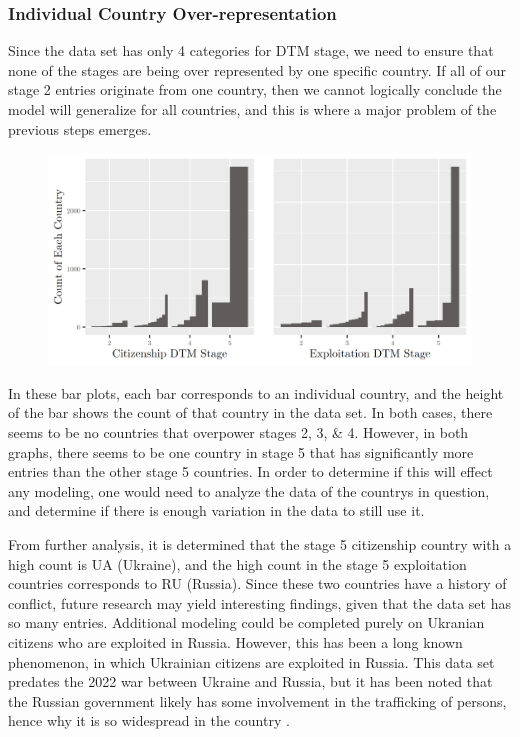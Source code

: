 \documentclass{article} %
\begin{document}
\subsubsection{Individual Country Over-representation}\label{Overrep}

Since the data set has only 4 categories for DTM stage, we need to ensure that none of the stages are being over represented by one specific country. If all of our stage 2 entries originate from one country, then we cannot logically conclude the model will generalize for all countries, and this is where a major problem of the previous steps emerges.

\FloatBarrier
\begin{figure}[H]
	\includegraphics[width = \textwidth]{CountryCountBarplot}
\end{figure}
\FloatBarrier

In these bar plots, each bar corresponds to an individual country, and the height of the bar shows the count of that country in the data set. In both cases, there seems to be no countries that overpower stages 2, 3, \& 4. However, in both graphs, there seems to be one country in stage 5 that has significantly more entries than the other stage 5 countries. In order to determine if this will effect any modeling, one would need to analyze the data of the countrys in question, and determine if there is enough variation in the data to still use it. 

From further analysis, it is determined that the stage 5 citizenship country with a high count is UA (Ukraine), and the high count in the stage 5 exploitation countries corresponds to RU (Russia). Since these two countries have a history of conflict, future research may yield interesting findings, given that the data set has so many entries. Additional modeling could be completed purely on Ukranian citizens who are exploited in Russia. However, this has been a long known phenomenon, in which Ukrainian citizens are exploited in Russia. This data set predates the 2022 war between Ukraine and Russia, but it has been noted that the Russian government likely has some involvement in the trafficking of persons, hence why it is so widespread in the country \parencite{RussiaTrafficking}.
\end{document}
